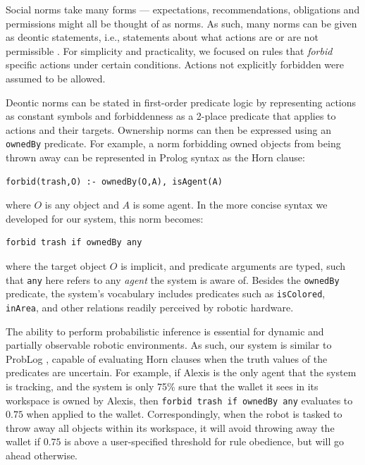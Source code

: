 \documentclass[letterpaper]{article} %
\begin{document}
Social norms take many forms --- expectations, recommendations, obligations and permissions might all be thought of as norms. As such, many norms can be given as deontic statements, i.e., statements about what actions are or are not permissible \cite{malle2017networks}. For simplicity and practicality, we focused on rules that \emph{forbid} specific actions under certain conditions. Actions not explicitly forbidden were assumed to be allowed.

Deontic norms can be stated in first-order predicate logic by representing actions as constant symbols and forbiddenness as a 2-place predicate that applies to actions and their targets. Ownership norms can then be expressed using an \texttt{\small{ownedBy}} predicate. For example, a norm forbidding owned objects from being thrown away can be represented in Prolog syntax as the Horn clause:
\begin{scriptsize}
\begin{verbatim}
forbid(trash,O) :- ownedBy(O,A), isAgent(A)
\end{verbatim}
\end{scriptsize}
where $O$ is any object and $A$ is some agent. In the more concise syntax we developed for our system, this norm becomes:
\begin{scriptsize}
\begin{verbatim}
forbid trash if ownedBy any
\end{verbatim}
\end{scriptsize}
where the target object $O$ is implicit, and predicate arguments are typed, such that \texttt{\small{any}} here refers to any \emph{agent} the system is aware of. Besides the \texttt{\small{ownedBy}} predicate, the system's vocabulary includes predicates such as \texttt{\small{isColored}}, \texttt{\small{inArea}}, and other relations readily perceived by robotic hardware.

The ability to perform probabilistic inference is essential for dynamic and partially observable robotic environments. As such, our system is similar to ProbLog \cite{de2007problog,de2010probabilistic}, capable of evaluating Horn clauses when the truth values of the predicates are uncertain. For example, if Alexis is the only agent that the system is tracking, and the system is only 75\% sure that the wallet it sees in its workspace is owned by Alexis, then \texttt{\small{forbid trash if ownedBy any}} evaluates to $0.75$ when applied to the wallet. Correspondingly, when the robot is tasked to throw away all objects within its workspace, it will avoid throwing away the wallet if $0.75$ is above a user-specified threshold for rule obedience, but will go ahead otherwise.
\end{document}
